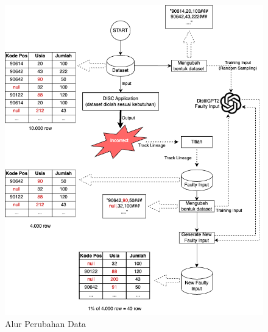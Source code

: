   \begin{figure}[H]
    \centering
    \includegraphics[scale=0.4]{gambar/AlurPerubahanData.png}
  
    \caption{Alur Perubahan Data}
    \label{fig:AlurPerubahanData}

  \end{figure}







